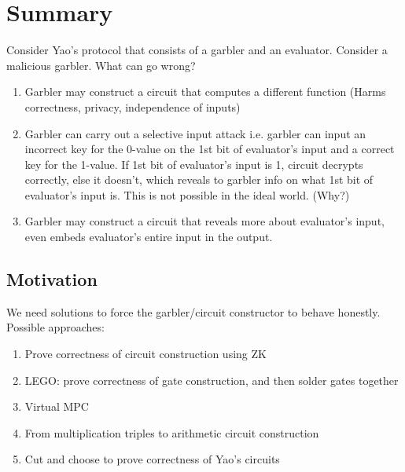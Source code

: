 
\clearpage
{}

%
\setcounter{section}{0} %

\section{Summary}
Consider Yao's protocol that consists of a garbler and an evaluator. Consider a malicious garbler. What can go wrong?
\begin{enumerate}
    \item Garbler may construct a circuit that computes a different function (Harms correctness, privacy, independence of inputs)
    \item Garbler can carry out a selective input attack i.e. garbler can input an incorrect key for the 0-value on the 1st bit of evaluator's input and a correct key for the 1-value. If 1st bit of evaluator's input is 1, circuit decrypts correctly, else it doesn't, which reveals to garbler info on what 1st bit of evaluator's input is. This is not possible in the ideal world. (Why?)
    \item Garbler may construct a circuit that reveals more about evaluator's input, even embeds evaluator's entire input in the output.
\end{enumerate}

\subsection{Motivation}
We need solutions to force the garbler/circuit constructor to behave honestly. Possible approaches:
\begin{enumerate}
    \item Prove correctness of circuit construction using ZK
    \item LEGO: prove correctness of gate construction, and then solder gates together
    \item Virtual MPC
    \item From multiplication triples to arithmetic circuit construction
    \item Cut and choose to prove correctness of Yao's circuits 
\end{enumerate}

